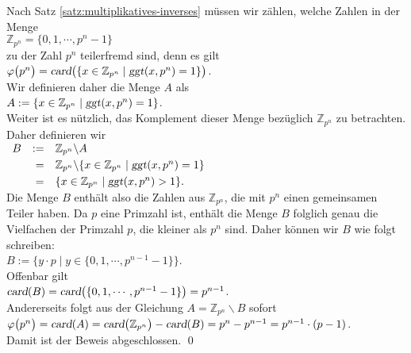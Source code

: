\proof
Nach Satz \ref{satz:multiplikatives-inverses} m\"{u}ssen wir z\"{a}hlen, welche Zahlen in der Menge
\\[0.2cm]
\hspace*{1.3cm}
$\mathbb{Z}_{p^n} = \{0, 1, \cdots, p^n-1\}$ 
\\[0.2cm]
zu der Zahl $p^{n}$ teilerfremd sind, denn es gilt
\\[0.2cm]
\hspace*{1.3cm}
$\varphi\bigl(p^n\bigr) = 
 \textsl{card}\bigl(\{ x \in \mathbb{Z}_{p^n} \mid \textsl{ggt}(x, p^n) = 1 \}\bigr)
$.
\\[0.2cm]
Wir definieren daher die Menge $A$ als
\\[0.2cm]
\hspace*{1.3cm}
$A := \{ x \in \mathbb{Z}_{p^n} \mid \textsl{ggt}(x, p^n) = 1 \}$.
\
\\[0.2cm]
Weiter ist es n\"{u}tzlich, das Komplement dieser Menge bez\"{u}glich $\mathbb{Z}_{p^n}$ zu betrachten. Daher
definieren wir 
\\[-0.2cm]
\hspace*{1.3cm}
$
\begin{array}[t]{lrl}
B & := & \mathbb{Z}_{p^n} \backslash A \\[0.1cm]
  &  = & \mathbb{Z}_{p^n} \backslash \{ x \in \mathbb{Z}_{p^n} \mid \textsl{ggt}(x, p^n) = 1 \} \\[0.1cm]
  &  = & \{ x \in \mathbb{Z}_{p^n} \mid \textsl{ggt}(x, p^n) > 1 \}.
\end{array}
$
\\[0.2cm]
Die Menge $B$ enth\"{a}lt also die Zahlen aus $\mathbb{Z}_{p^n}$, die mit $p^n$ einen gemeinsamen Teiler
haben.  Da $p$ eine Primzahl ist, enth\"{a}lt die Menge $B$ folglich genau die Vielfachen  der Primzahl
$p$, die kleiner als $p^n$ sind.  Daher k\"{o}nnen wir $B$ wie folgt schreiben:
\\[0.2cm]
\hspace*{1.3cm}
$B := \bigl\{ y \cdot p \mid y \in \{ 0, 1, \cdots, p^{n-1} - 1\} \bigr\}$.
\\[0.2cm]
Offenbar gilt
\\[0.2cm]
\hspace*{1.3cm}
$\textsl{card}(B) = \textsl{card}\bigl(\{ 0, 1, \cdots, p^{n-1} - 1\}\bigr) = p^{n-1}$.
\\[0.2cm]
Andererseits folgt aus der Gleichung $A = \mathbb{Z}_{p^n} \backslash B$ sofort
\\[0.2cm]
\hspace*{1.3cm}
$\varphi\bigl(p^n\bigr) = \textsl{card}(A) = \textsl{card}\bigl(\mathbb{Z}_{p^n}\bigr) - \textsl{card}(B)
                  = p^n - p^{n-1} = p^{n-1} \cdot (p - 1)$.
\\[0.2cm]
Damit ist der Beweis abgeschlossen. \qed
\vspace*{0.3cm}

